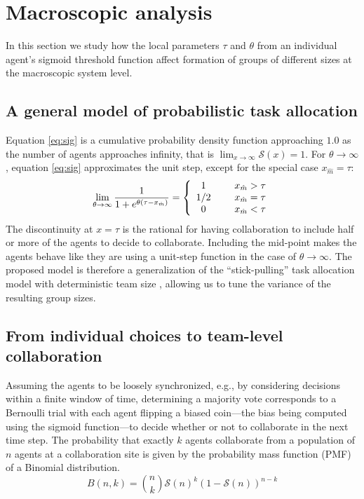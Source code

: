 \documentclass{TeXstyles/DARS/svmult}  %
\newcommand{\sig}{\mathcal{S}}
\newcommand{\xm}{x_{\hat{m}}}
\begin{document}
\section{Macroscopic analysis}\label{sec:macromodel}
In this section we study how the local parameters $\tau$ and $\theta$ from an individual agent's sigmoid threshold function affect formation of groups of different sizes at the macroscopic system level.

\subsection{A general model of probabilistic task allocation}
Equation \eqref{eq:sig} is a cumulative probability density function approaching $1.0$ as the number of agents approaches infinity, that is $\lim_{x \to \infty}\sig(x)=1$. For $\theta \to \infty$, equation \eqref{eq:sig} approximates the unit step, except for the special case $\xm=\tau$:
\begin{equation}
\lim_{\theta \to \infty} \frac{1}{1+e^{\theta(\tau-\xm)}}=
\left\{
\begin{array}{cc}
 1 & \hspace{.5cm} \xm>\tau \\
 1/2 & \hspace{.5cm} \xm=\tau \\
 0 & \hspace{.5cm} \xm<\tau
\end{array}
\right.
\end{equation}
The discontinuity at $x=\tau$ is the rational for having collaboration to include half or more of the agents to decide to collaborate. Including the mid-point makes the agents behave like they are using a unit-step function in the case of $\theta \to \infty$. The proposed model is therefore a generalization of the ``stick-pulling'' task allocation model with deterministic team size \cite{Lerman2001}, allowing us to tune the variance of the resulting group sizes. 

\subsection{From individual choices to team-level collaboration}
Assuming the agents to be loosely synchronized, e.g., by considering decisions within a finite window of time, determining a majority vote corresponds to a Bernoulli trial with each agent flipping a biased coin---the bias being computed using the sigmoid function---to decide whether or not to collaborate in the next time step. The probability that exactly $k$ agents collaborate from a population of $n$ agents at a collaboration site is given by the probability mass function (PMF) of a Binomial distribution.
\begin{equation}
	B(n, k) = \binom{n}{k}\sig(n)^{k}\left(1 - \sig(n)\right)^{n - k}\label{eq:binomial}
\end{equation}
\end{document}
